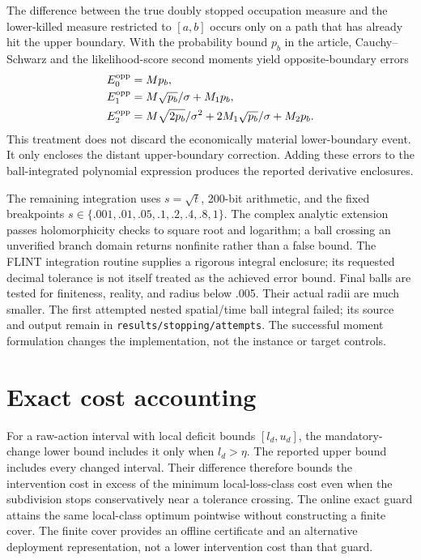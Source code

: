 The difference between the true doubly stopped occupation measure and the lower-killed measure restricted to $[a,b]$ occurs only on a path that has already hit the upper boundary. With the probability bound $p_b$ in the article, Cauchy--Schwarz and the likelihood-score second moments yield opposite-boundary errors
\begin{align}
 E_0^{\rm opp}&=Mp_b,\\
 E_1^{\rm opp}&=M\sqrt{p_b}/\sigma+M_1p_b,\\
 E_2^{\rm opp}&=M\sqrt{2p_b}/\sigma^2+2M_1\sqrt{p_b}/\sigma+M_2p_b.
\end{align}
This treatment does not discard the economically material lower-boundary event. It only encloses the distant upper-boundary correction. Adding these errors to the ball-integrated polynomial expression produces the reported derivative enclosures.

The remaining integration uses $s=\sqrt t$, 200-bit arithmetic, and the fixed breakpoints $s\in\{.001,.01,.05,.1,.2,.4,.8,1\}$. The complex analytic extension passes holomorphicity checks to square root and logarithm; a ball crossing an unverified branch domain returns nonfinite rather than a false bound. The FLINT integration routine supplies a rigorous integral enclosure; its requested decimal tolerance is not itself treated as the achieved error bound. Final balls are tested for finiteness, reality, and radius below .005. Their actual radii are much smaller. The first attempted nested spatial/time ball integral failed; its source and output remain in \texttt{results/stopping/attempts}. The successful moment formulation changes the implementation, not the instance or target controls.

\section{Exact cost accounting}
For a raw-action interval with local deficit bounds $[l_d,u_d]$, the mandatory-change lower bound includes it only when $l_d>\eta$. The reported upper bound includes every changed interval. Their difference therefore bounds the intervention cost in excess of the minimum local-loss-class cost even when the subdivision stops conservatively near a tolerance crossing. The online exact guard attains the same local-class optimum pointwise without constructing a finite cover. The finite cover provides an offline certificate and an alternative deployment representation, not a lower intervention cost than that guard.

